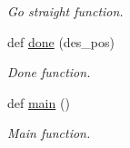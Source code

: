 \begin{DoxyCompactItemize}
\begin{DoxyCompactList}\small\item\em Go straight function. \end{DoxyCompactList}\item 
def \hyperlink{namespacego__to__point__service__bug_a181271bc83dc620614c43e6bd6b18db8}{done} (des\+\_\+pos)
\begin{DoxyCompactList}\small\item\em Done function. \end{DoxyCompactList}\item 
def \hyperlink{namespacego__to__point__service__bug_abb5a5a69905cef8ab5baf0768056ecea}{main} ()
\begin{DoxyCompactList}\small\item\em Main function. \end{DoxyCompactList}\end{DoxyCompactItemize}
